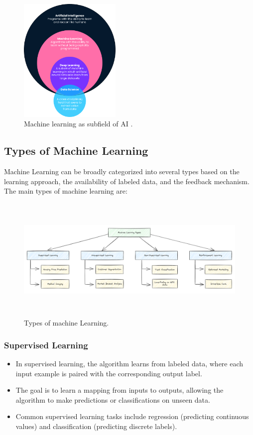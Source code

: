 \begin{figure}[htpb]
    \centering
    \includegraphics[width=\textwidth,height=6cm,keepaspectratio=true]{ml.png}
    \caption{
        Machine learning as subfield of AI \cite{datacamp:ml}.
    }
\end{figure}

\subsection{Types of Machine Learning}

Machine Learning can be broadly categorized into several types based on the learning approach, the availability of labeled data, and the feedback mechanism. The main types of machine learning are:

\begin{figure}[htpb]
    \centering
    \includegraphics[width=\textwidth,height=6cm,keepaspectratio=true]{ml-types.png}
    \caption{
        Types of machine Learning.
    }
\end{figure}

\subsubsection*{Supervised Learning}

\begin{itemize}
    \item{In supervised learning, the algorithm learns from labeled data, where each input example is paired with the corresponding output label.}
    \item{The goal is to learn a mapping from inputs to outputs, allowing the algorithm to make predictions or classifications on unseen data.}
    \item{Common supervised learning tasks include regression (predicting continuous values) and classification (predicting discrete labels).}
\end{itemize}

